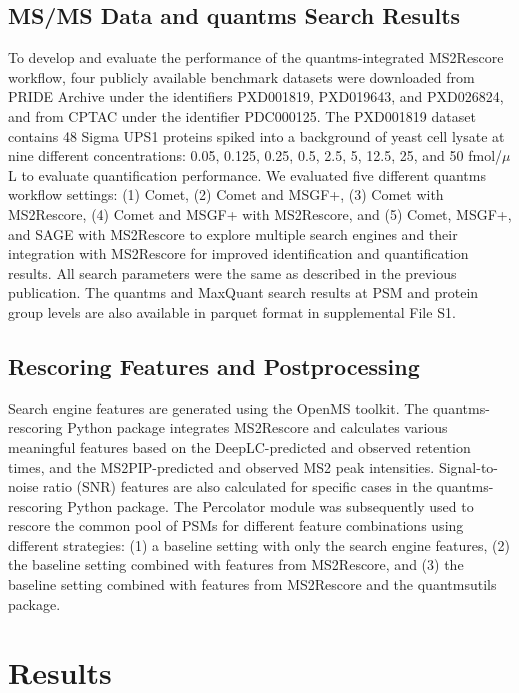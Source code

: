 \documentclass[12pt]{article}
\begin{document}
\subsection{MS/MS Data and quantms Search Results}
To develop and evaluate the performance of the quantms-integrated MS2Rescore workflow, four publicly available benchmark datasets were downloaded from PRIDE Archive under the identifiers PXD001819, PXD019643, and PXD026824, and from CPTAC under the identifier PDC000125. The PXD001819 dataset contains 48 Sigma UPS1 proteins spiked into a background of yeast cell lysate at nine different concentrations: 0.05, 0.125, 0.25, 0.5, 2.5, 5, 12.5, 25, and 50 fmol/$\mu$L to evaluate quantification performance. We evaluated five different quantms workflow settings: (1) Comet, (2) Comet and MSGF+, (3) Comet with MS2Rescore, (4) Comet and MSGF+ with MS2Rescore, and (5) Comet, MSGF+, and SAGE with MS2Rescore to explore multiple search engines and their integration with MS2Rescore for improved identification and quantification results. All search parameters were the same as described in the previous publication. The quantms and MaxQuant search results at PSM and protein group levels are also available in parquet format in supplemental File S1.

\subsection{Rescoring Features and Postprocessing}
Search engine features are generated using the OpenMS toolkit. The quantms-rescoring Python package integrates MS2Rescore and calculates various meaningful features based on the DeepLC-predicted and observed retention times, and the MS2PIP-predicted and observed MS2 peak intensities. Signal-to-noise ratio (SNR) features are also calculated for specific cases in the quantms-rescoring Python package. The Percolator module was subsequently used to rescore the common pool of PSMs for different feature combinations using different strategies: (1) a baseline setting with only the search engine features, (2) the baseline setting combined with features from MS2Rescore, and (3) the baseline setting combined with features from MS2Rescore and the quantmsutils package.

\section{Results}
\end{document}
